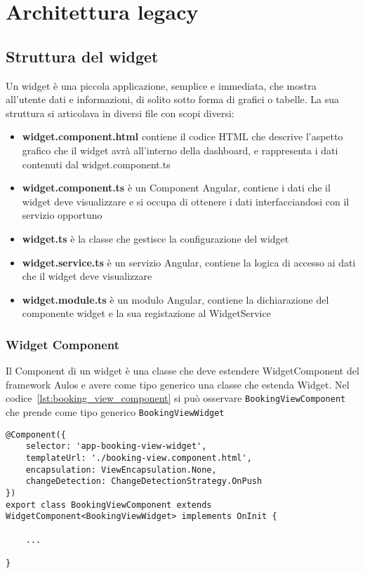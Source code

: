 \chapter{Architettura legacy}
\section{Struttura del widget}
Un widget è una piccola applicazione, semplice e immediata, che mostra all'utente dati e informazioni, di solito sotto forma di grafici o tabelle.
La sua struttura si articolava in diversi file con scopi diversi:
\begin{itemize}
\item \textbf{widget.component.html} contiene il codice HTML che descrive l'aspetto grafico che il widget avrà all'interno della dashboard, e rappresenta i dati contenuti dal widget.component.ts
\item \textbf{widget.component.ts} è un Component Angular, contiene i dati che il widget deve visualizzare e si occupa di ottenere i dati interfacciandosi con il servizio opportuno
\item \textbf{widget.ts} è la classe che gestisce la configurazione del widget
\item \textbf{widget.service.ts} è un servizio Angular, contiene la logica di accesso ai dati che il widget deve visualizzare
\item \textbf{widget.module.ts} è un modulo Angular, contiene la dichiarazione del componente widget e la sua registazione al WidgetService
\end{itemize}

\subsection{Widget Component}
Il Component di un widget è una classe che deve estendere WidgetComponent del framework Aulos e avere come tipo generico una classe che estenda Widget. Nel codice~\ref{lst:booking_view_component} si può osservare \verb|BookingViewComponent| che prende come tipo generico \verb|BookingViewWidget|
\begin{lstlisting}[caption={orders.component.ts},label={lst:booking_view_component},style=javascriptCode]
@Component({
    selector: 'app-booking-view-widget',
    templateUrl: './booking-view.component.html',
    encapsulation: ViewEncapsulation.None,
    changeDetection: ChangeDetectionStrategy.OnPush
})
export class BookingViewComponent extends WidgetComponent<BookingViewWidget> implements OnInit {

	...

}
\end{lstlisting}
